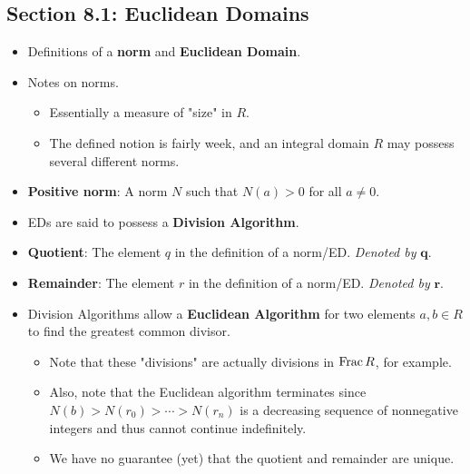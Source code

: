 \documentclass[../notes.tex]{subfiles}
\begin{document}
\subsection*{Section 8.1: Euclidean Domains}
\begin{itemize}
    \item Definitions of a \textbf{norm} and \textbf{Euclidean Domain}.
    \item Notes on norms.
    \begin{itemize}
        \item Essentially a measure of "size" in $R$.
        \item The defined notion is fairly week, and an integral domain $R$ may possess several different norms.
    \end{itemize}
    \item \textbf{Positive norm}: A norm $N$ such that $N(a)>0$ for all $a\neq 0$.
    \item EDs are said to possess a \textbf{Division Algorithm}.
    \item \textbf{Quotient}: The element $q$ in the definition of a norm/ED. \emph{Denoted by} $\bm{q}$.
    \item \textbf{Remainder}: The element $r$ in the definition of a norm/ED. \emph{Denoted by} $\bm{r}$.
    \item {}Division Algorithms allow a \textbf{Euclidean Algorithm} for two elements $a,b\in R$ to find the greatest common divisor.
    \begin{itemize}
        \item Note that these "divisions" are actually divisions in $\operatorname{Frac} R$, for example.
        \item Also, note that the Euclidean algorithm terminates since $N(b)>N(r_0)>\cdots>N(r_n)$ is a decreasing sequence of nonnegative integers and thus cannot continue indefinitely.
        \item We have no guarantee (yet) that the quotient and remainder are unique.
    \end{itemize}

\end{itemize}
\end{document}
